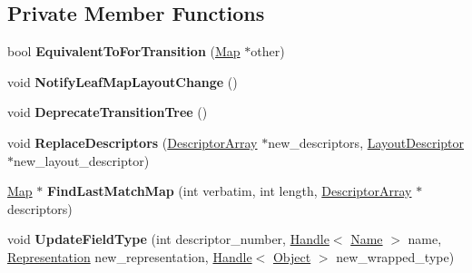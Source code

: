 \subsection*{Private Member Functions}
\begin{DoxyCompactItemize}
\item 
bool {\bfseries Equivalent\+To\+For\+Transition} (\hyperlink{classv8_1_1internal_1_1_map}{Map} $\ast$other)\hypertarget{classv8_1_1internal_1_1_map_add0442904fb0a47755acc35d1dfd080b}{}\label{classv8_1_1internal_1_1_map_add0442904fb0a47755acc35d1dfd080b}

\item 
void {\bfseries Notify\+Leaf\+Map\+Layout\+Change} ()\hypertarget{classv8_1_1internal_1_1_map_a46c9ea457325cdb1e6abe44bc79e78f9}{}\label{classv8_1_1internal_1_1_map_a46c9ea457325cdb1e6abe44bc79e78f9}

\item 
void {\bfseries Deprecate\+Transition\+Tree} ()\hypertarget{classv8_1_1internal_1_1_map_a7685706fb0e5d7c4584ddf39cf90cbfa}{}\label{classv8_1_1internal_1_1_map_a7685706fb0e5d7c4584ddf39cf90cbfa}

\item 
void {\bfseries Replace\+Descriptors} (\hyperlink{classv8_1_1internal_1_1_descriptor_array}{Descriptor\+Array} $\ast$new\+\_\+descriptors, \hyperlink{classv8_1_1internal_1_1_layout_descriptor}{Layout\+Descriptor} $\ast$new\+\_\+layout\+\_\+descriptor)\hypertarget{classv8_1_1internal_1_1_map_a65e0b9649a5a313b0663e674567f7f04}{}\label{classv8_1_1internal_1_1_map_a65e0b9649a5a313b0663e674567f7f04}

\item 
\hyperlink{classv8_1_1internal_1_1_map}{Map} $\ast$ {\bfseries Find\+Last\+Match\+Map} (int verbatim, int length, \hyperlink{classv8_1_1internal_1_1_descriptor_array}{Descriptor\+Array} $\ast$descriptors)\hypertarget{classv8_1_1internal_1_1_map_aabe64d686e0c27e198011e96989154f3}{}\label{classv8_1_1internal_1_1_map_aabe64d686e0c27e198011e96989154f3}

\item 
void {\bfseries Update\+Field\+Type} (int descriptor\+\_\+number, \hyperlink{classv8_1_1internal_1_1_handle}{Handle}$<$ \hyperlink{classv8_1_1internal_1_1_name}{Name} $>$ name, \hyperlink{classv8_1_1internal_1_1_representation}{Representation} new\+\_\+representation, \hyperlink{classv8_1_1internal_1_1_handle}{Handle}$<$ \hyperlink{classv8_1_1internal_1_1_object}{Object} $>$ new\+\_\+wrapped\+\_\+type)\hypertarget{classv8_1_1internal_1_1_map_a294340d5aa515d799a0671c125fce82f}{}\label{classv8_1_1internal_1_1_map_a294340d5aa515d799a0671c125fce82f}


\end{DoxyCompactItemize}
